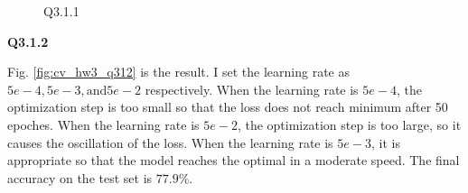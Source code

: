 \documentclass[
  course = {{16-720B Computer Vision}},
  quartile = {{1}},
  assignment = 3-Neural\ Networks\ for\ Recognition,
  name = {{Kangle Deng}},
  email = {{kangled@andrew.cmu.edu}},
  firstexercise = 1
]{aga-homework}
\begin{document}
\begin{figure}
    \centering
    \caption{Q3.1.1}
    \label{fig:cv_hw3_q311}
\end{figure}

\noindent \textbf{Q3.1.2}

Fig. \ref{fig:cv_hw3_q312} is the result. I set the learning rate as $5e-4, 5e-3, \text{and} 5e-2$ respectively. When the learning rate is $5e-4$, the optimization step is too small so that the loss does not reach minimum after 50 epoches. When the learning rate is $5e-2$, the optimization step is too large, so it causes the oscillation of the loss. When the learning rate is $5e-3$, it is appropriate so that the model reaches the optimal in a moderate speed. The final accuracy on the test set is $77.9\%$.
\end{document}
